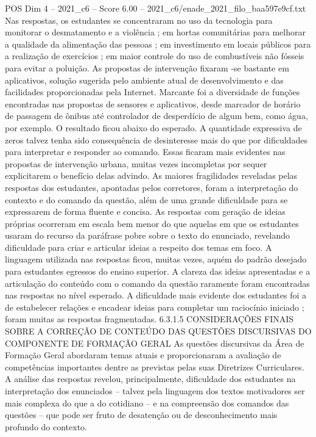 \begin{textsample}{POS Dim 4 – 2021\_c6 – Score 6.00 – 2021\_c6/enade\_2021\_filo\_baa597e9cf.txt}
Nas respostas, os estudantes se concentraram no uso da tecnologia para monitorar o desmatamento e a violência ; em hortas comunitárias para melhorar a qualidade da alimentação das pessoas ; em investimento em locais públicos para a realização de exercícios ; em maior controle do uso de combustíveis não fósseis para evitar a poluição.
As propostas de intervenção fixaram -se bastante em aplicativos, solução sugerida pelo ambiente atual de desenvolvimento e das facilidades proporcionadas pela Internet.
Marcante foi a diversidade de funções encontradas nas propostas de sensores e aplicativos, desde marcador de horário de passagem de ônibus até controlador de desperdício de algum bem, como água, por exemplo.
O resultado ficou abaixo do esperado.
A quantidade expressiva de zeros talvez tenha sido consequência de desinteresse mais do que por dificuldades para interpretar e responder ao comando.
Essas ficaram mais evidentes nas propostas de intervenção urbana, muitas vezes incompletas por sequer explicitarem o benefício delas advindo.
As maiores fragilidades reveladas pelas respostas dos estudantes, apontadas pelos corretores, foram a interpretação do contexto e do comando da questão, além de uma grande dificuldade para se expressarem de forma fluente e concisa.
As respostas com geração de ideias próprias ocorreram em escala bem menor do que aquelas em que os estudantes usaram do recurso da paráfrase pobre sobre o texto do enunciado, revelando dificuldade para criar e articular ideias a respeito dos temas em foco.
A linguagem utilizada nas respostas ficou, muitas vezes, aquém do padrão desejado para estudantes egressos do ensino superior.
A clareza das ideias apresentadas e a articulação do conteúdo com o comando da questão raramente foram encontradas nas respostas no nível esperado.
A dificuldade mais evidente dos estudantes foi a de estabelecer relações e encadear ideias para completar um raciocínio iniciado ; foram muitas as respostas fragmentadas. 6.3.1.5 CONSIDERAÇÕES FINAIS SOBRE A CORREÇÃO DE CONTEÚDO DAS QUESTÕES DISCURSIVAS DO COMPONENTE DE FORMAÇÃO GERAL As questões discursivas da Área de Formação Geral abordaram temas atuais e proporcionaram a avaliação de competências importantes dentre as previstas pelas suas Diretrizes Curriculares.
A análise das respostas revelou, principalmente, dificuldade dos estudantes na interpretação dos enunciados – talvez pela linguagem dos textos motivadores ser mais complexa do que a do cotidiano – e na compreensão dos comandos das questões – que pode ser fruto de desatenção ou de desconhecimento mais profundo do contexto.

\end{textsample}
